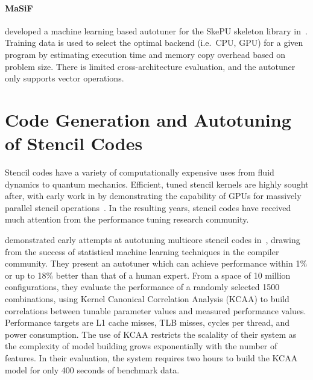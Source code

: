 \paragraph{MaSiF} 


\citeauthor{Dastgeer2011} developed a machine learning based autotuner
for the SkePU skeleton library in~\cite{Dastgeer2011}. Training data
is used to select the optimal backend (i.e.\ CPU, GPU) for a given
program by estimating execution time and memory copy overhead based on
problem size. There is limited cross-architecture evaluation, and the
autotuner only supports vector operations.



\section{Code Generation and Autotuning of Stencil Codes}

Stencil codes have a variety of computationally expensive uses from
fluid dynamics to quantum mechanics. Efficient, tuned stencil kernels
are highly sought after, with early work in \citeyear{Bolz2003} by
\citeauthor{Bolz2003} demonstrating the capability of GPUs for
massively parallel stencil operations~\cite{Bolz2003}. In the
resulting years, stencil codes have received much attention from the
performance tuning research community.


\citeauthor{Ganapathi2009} demonstrated early attempts at autotuning
multicore stencil codes in~\cite{Ganapathi2009}, drawing from the
success of statistical machine learning techniques in the compiler
community. They present an autotuner which can achieve performance
within 1\% or up to 18\% better than that of a human expert. From a
space of 10 million configurations, they evaluate the performance of a
randomly selected 1500 combinations, using Kernel Canonical
Correlation Analysis (KCAA) to build correlations between tunable
parameter values and measured performance values. Performance targets
are L1 cache misses, TLB misses, cycles per thread, and power
consumption. The use of KCAA restricts the scalality of their system
as the complexity of model building grows exponentially with the
number of features. In their evaluation, the system requires two hours
to build the KCAA model for only 400 seconds of benchmark data.

